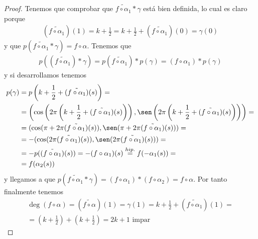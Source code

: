 \begin{lema}
\begin{proof}
        Tenemos que comprobar que $\tilde{f\circ \alpha_1} \ast \gamma$ está bien definida, lo cual es claro porque
        \begin{gather*}
            (\tilde{f\circ \alpha_1})(1) = k + \frac{1}{2} = k + \frac{1}{2} + (\tilde{f\circ \alpha_1})(0) = \gamma(0)
        \end{gather*}
        y que $p(\tilde{f\circ \alpha_1} \ast \gamma) = f \circ \alpha$. Tenemos que 
        \begin{gather*}
            p((\tilde{f\circ \alpha_1}) \ast \gamma) = p(\tilde{f\circ \alpha_1}) \ast p(\gamma) = (f\circ \alpha_1) \ast p(\gamma)
        \end{gather*}
        y si desarrollamos tenemos
        \begin{align*}
            p(\gamma) &= p\left(k+\frac{1}{2} + (\tilde{f\circ \alpha_1})(s) \right) =\\
            &= \left(\cos\left(2\pi \left(k + \frac{1}{2} + (\tilde{f\circ \alpha_1})(s)\right)\right), \sen\left(2\pi \left(k + \frac{1}{2} + (\tilde{f\circ \alpha_1})(s)\right)\right)\right) = \\
            &= (\cos (\pi + 2 \pi (\tilde{f\circ \alpha_1})(s)), \sen (\pi + 2 \pi (\tilde{f\circ \alpha_1})(s))) = \\
            &=-(\cos (2\pi(\tilde{f\circ \alpha_1})(s)), \sen (2 \pi (\tilde{f\circ \alpha_1})(s))) = \\
            &= -p((\tilde{f\circ \alpha_1})(s)) = -(f\circ \alpha_1)(s) \overset{hip.}{=} f(-\alpha_1(s)) =\\
            &= f(\alpha_2(s))
        \end{align*}
        y llegamos a que $p(\tilde{f\circ \alpha_1} \ast \gamma) = (f\circ \alpha_1) \ast (f\circ \alpha_2) = f \circ \alpha$. Por tanto finalmente tenemos
        \begin{gather*}
            \deg(f\circ \alpha) = (\tilde{f\circ \alpha})(1) = \gamma(1) = k + \frac{1}{2} + (\tilde{f\circ \alpha_1})(1)=\\
            =\left(k + \frac{1}{2}\right) + \left(k+\frac{1}{2}\right) = 2k + 1 \text{ impar}
        \end{gather*}
    \end{proof}
\end{lema}

